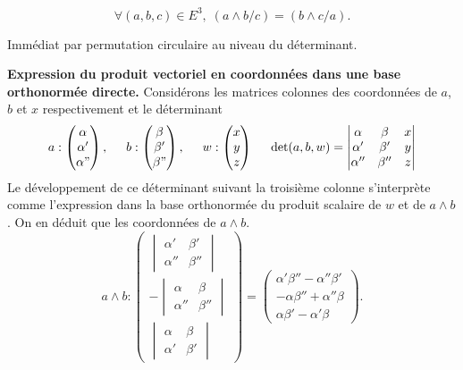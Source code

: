 \begin{propn}[Tournicoter]
\[
 \forall (a,b,c) \in E^3, \; (a\wedge b / c) = (b\wedge c /a).
\]
\end{propn}
\begin{demo}
 Immédiat par permutation circulaire au niveau du déterminant.
\end{demo}
\clearpage
\textbf{Expression du produit vectoriel en coordonnées dans une base orthonormée directe.}\newline
Considérons les matrices colonnes des coordonnées de $a$, $b$ et $x$ respectivement et le déterminant
\[
 a: \begin{pmatrix}
     \alpha \\ \alpha' \\ \alpha"
    \end{pmatrix}, \hspace{0.5cm}
 b: \begin{pmatrix}
     \beta \\ \beta' \\ \beta"
    \end{pmatrix}, \hspace{0.5cm}
 w: \begin{pmatrix}
     x \\ y \\ z
    \end{pmatrix} \hspace{0.5cm}
\det(a,b,w) = 
\begin{vmatrix}
 \alpha & \beta & x \\
 \alpha' & \beta' & y \\
 \alpha'' & \beta'' & z
\end{vmatrix}
\]
Le développement de ce déterminant suivant la troisième colonne s'interprète comme l'expression dans la base orthonormée du produit scalaire de $w$ et de $a\wedge b$. On en déduit que les coordonnées de $a\wedge b$.
\[
 a\wedge b : 
 \begin{pmatrix}
  \begin{vmatrix}
   \alpha' & \beta' \\ \alpha'' & \beta''
  \end{vmatrix}\\
  -\begin{vmatrix}
   \alpha & \beta \\ \alpha'' & \beta ''
  \end{vmatrix} \\
  \begin{vmatrix}
   \alpha & \beta \\ \alpha' & \beta'
  \end{vmatrix}
 \end{pmatrix}
 =
 \begin{pmatrix}
  \alpha' \beta'' -\alpha'' \beta' \\ -\alpha \beta'' + \alpha'' \beta \\ \alpha \beta' - \alpha' \beta
 \end{pmatrix}
.
\]

